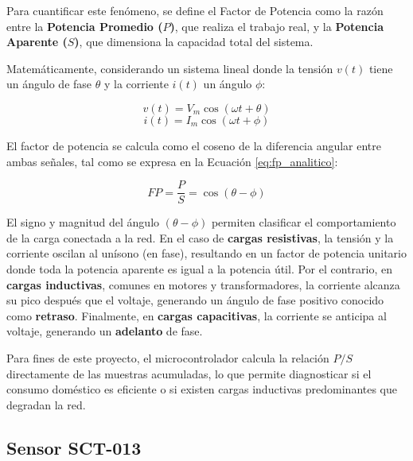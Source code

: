             Para cuantificar este fenómeno, se define el Factor de Potencia como la razón entre la \textbf{Potencia Promedio ($P$)}, que realiza el trabajo real, y la \textbf{Potencia Aparente ($S$)}, que dimensiona la capacidad total del sistema.

            Matemáticamente, considerando un sistema lineal donde la tensión $v(t)$ tiene un ángulo de fase $\theta$ y la corriente $i(t)$ un ángulo $\phi$:

            \begin{equation}
                v(t) = V_m \cos(\omega t + \theta)
                \label{eq:tension_fase}
            \end{equation}
            \begin{equation}
                i(t) = I_m \cos(\omega t + \phi)
                \label{eq:corriente_fase}
            \end{equation}

            El factor de potencia se calcula como el coseno de la diferencia angular entre ambas señales, tal como se expresa en la Ecuación \ref{eq:fp_analitico}:

            \begin{equation}
                FP = \frac{P}{S} = \cos(\theta - \phi)
                \label{eq:fp_analitico}
            \end{equation}

            El signo y magnitud del ángulo $(\theta - \phi)$ permiten clasificar el comportamiento de la carga conectada a la red. En el caso de \textbf{cargas resistivas}, la tensión y la corriente oscilan al unísono (en fase), resultando en un factor de potencia unitario donde toda la potencia aparente es igual a la potencia útil. Por el contrario, en \textbf{cargas inductivas}, comunes en motores y transformadores, la corriente alcanza su pico después que el voltaje, generando un ángulo de fase positivo conocido como \textbf{retraso}. Finalmente, en \textbf{cargas capacitivas}, la corriente se anticipa al voltaje, generando un \textbf{adelanto} de fase.

            Para fines de este proyecto, el microcontrolador calcula la relación $P/S$ directamente de las muestras acumuladas, lo que permite diagnosticar si el consumo doméstico es eficiente o si existen cargas inductivas predominantes que degradan la red.
        \newpage

    \subsection{Sensor SCT-013}

